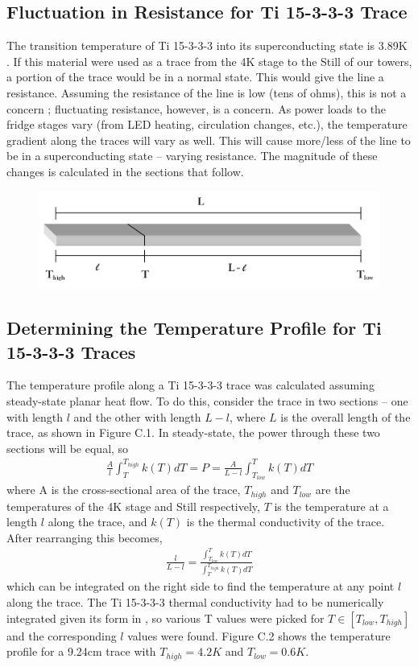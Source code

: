 \documentclass{report}
\begin{document}
\begin{appendices}
\chapter{Fluctuation in Resistance for Ti 15-3-3-3 Trace}
The transition temperature of Ti 15-3-3-3 into its superconducting state is 3.89K \cite{wik}. If this material were used as a trace from the 4K stage to the Still of our towers, a portion of the trace would be in a normal state. This would give the line a resistance. Assuming the resistance of the line is low (tens of ohms), this is not a concern ; fluctuating resistance, however, is a concern. As power loads to the fridge stages vary (from LED heating, circulation changes, etc.), the temperature gradient along the traces will vary as well. This will cause more/less of the line to be in a superconducting state -- varying resistance. The magnitude of these changes is calculated in the sections that follow.

\begin{figure}[h]
\centering
\includegraphics[width = .5\textwidth]{Ti15333_trace_resistivity_section.png}
\caption{}
\end{figure}

\section{Determining the Temperature Profile for Ti 15-3-3-3 Traces}
The temperature profile along a Ti 15-3-3-3 trace was calculated assuming steady-state planar heat flow. To do this, consider the trace in two sections -- one with length $l$ and the other with length $L-l$, where $L$ is the overall length of the trace, as shown in Figure C.1. In steady-state, the power through these two sections will be equal, so
\begin{eqnarray}
\frac{A}{l}\int_{T}^{T_{high}} k(T)dT = P = \frac{A}{L - l}\int_{T_{low}}^{T} k(T)dT
\end{eqnarray}
where A is the cross-sectional area of the trace, $T_{high}$ and $T_{low}$ are the temperatures of the 4K stage and Still respectively, $T$ is the temperature at a length $l$ along the trace, and $k(T)$ is the thermal conductivity of the trace. After rearranging this becomes,
\begin{eqnarray}
\frac{l}{L-l} = \frac{\int_{T_{low}}^{T} k(T)dT}{\int_{T}^{T_{high}} k(T)dT}
\end{eqnarray}
which can be integrated on the right side to find the temperature at any point $l$ along the trace. The Ti 15-3-3-3 thermal conductivity had to be numerically integrated given its form in \cite{wik}, so various T values were picked for $T \in [T_{low},T_{high}]$ and the corresponding $l$ values were found. Figure C.2 shows the temperature profile for a 9.24cm trace with $T_{high} = 4.2K$ and $T_{low}=0.6K$.


\end{appendices}
\end{document}
